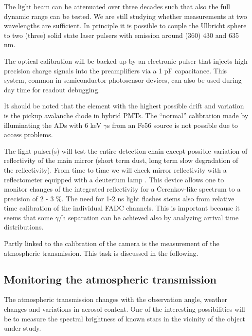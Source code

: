 The light beam can be attenuated over three decades such that also the full
dynamic range can be tested. We are still studying whether measurements at
two wavelengths are sufficient. In principle it is possible to couple the
Ulbricht sphere to two (three) solid state laser pulsers with emission
around (360) 430 and 635 nm.

The optical calibration will be backed up by an electronic pulser that
injects high precision charge signals into the preamplifiers via a 1 pF
capacitance. This system, common in semiconductor photosensor devices, can
also be used during day time for readout debugging.

It should be noted that the element with the highest possible drift and
variation is the pickup avalanche diode in hybrid PMTs. The ``normal''
calibration made by illuminating the ADs with 6 keV $\gamma$s from an Fe56 source
is not possible due to access problems.

The light pulser(s) will test the entire detection chain except possible
variation of reflectivity of the main mirror (short term dust, long term
slow degradation of the reflectivity). From time to time we will check
mirror reflectivity with a reflectometer equipped with a deuterium lamp 
\cite{bradbury:95}. This device allows one to monitor
changes of the integrated reflectivity for a \v{C}erenkov-like spectrum to a
precision of 2 - 3 \%. The need for 1-2 ns light flashes stems also from
relative time calibration of the individual FADC channels. This is important
because it seems that some $\gamma $/h separation can be achieved also by analyzing arrival
time distributions.

Partly linked to the calibration of the camera is the measurement of the
atmospheric transmission. This task is discussed in the following.

\subsection{Monitoring the atmospheric transmission}


\medskip The atmospheric transmission changes with the observation angle,
weather chan\-ges and variations in aerosol content. 
One of the interesting possibilities will be to
measure the 
spectral brightness of known stars in the vicinity of the object under
study.

